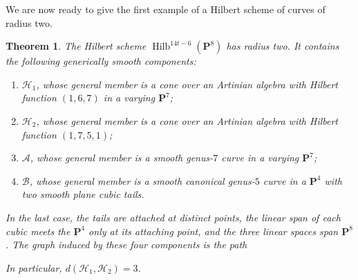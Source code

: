 \documentclass[leqno,11pt,a4paper]{amsart}
\newtheorem{thm}{Theorem}[section]
\theoremstyle{definition}
\numberwithin{equation}{section}
\newcommand{\PP}{\mathbf{P}}
\newcommand{\HH}{\mathcal{H}}
\DeclareMathOperator{\Hilb}{Hilb}
\begin{document}
We are now ready to give the first example of a Hilbert scheme of curves of radius two. 

\begin{thm}\label{radius_two_14} 
The Hilbert scheme $\Hilb^{14t-6}(\PP^8)$ has radius two. It contains the following generically smooth components:
\begin{enumerate}
\item $\HH_1$, whose general member is a cone over an Artinian algebra with Hilbert function $(1,6,7)$ in a varying $\PP^7$;
\item $\HH_2$, whose general member is a cone over an Artinian algebra with Hilbert function $(1,7,5,1)$;
\item $\mathcal A$, whose general member is a smooth genus-$7$ curve in a varying $\PP^7$;
\item $\mathcal B$, whose general member is a smooth canonical genus-$5$ curve in a $\PP^4$ with two smooth plane cubic tails.
\end{enumerate}
In the last case, the tails are attached at distinct points, the linear span of each cubic meets the $\PP^4$ only at its attaching point, and the three linear spaces span $\PP^8$. The graph induced by these four components is the path
\begin{center}
\end{center}
In particular, $d(\HH_1,\HH_2)=3$.
\end{thm}
\end{document}
